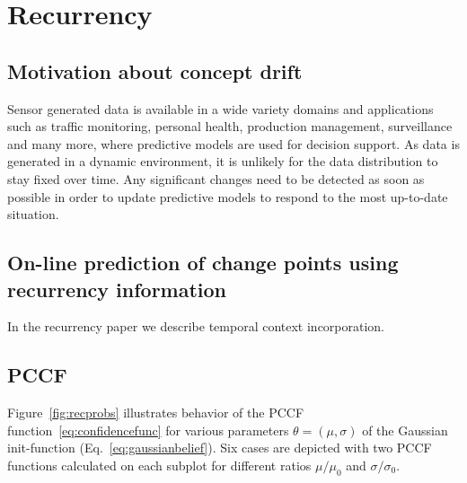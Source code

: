 \chapter{Recurrency}




\section{Motivation about concept drift}
Sensor generated data is available in a wide variety domains and applications such as traffic monitoring, personal health, production management, surveillance and many more, where predictive models are used for decision support.
As data is generated in a dynamic environment, it is unlikely for the data distribution to stay fixed over time.
Any significant changes need to be detected as soon as possible in order to update predictive models to respond to the most up-to-date situation.
\section{On-line prediction of change points using recurrency information}
In the recurrency paper we describe temporal context incorporation.


\section{PCCF}
Figure~\ref{fig:recprobs} illustrates behavior of the PCCF function~\ref{eq:confidencefunc} for  various parameters $\theta = (\mu, \sigma)$ of the Gaussian init-function (Eq.~\ref{eq:gaussianbelief}).%
Six cases are depicted with two PCCF functions calculated on each subplot for different ratios $\mu / \mu_0$ and $\sigma / \sigma_0$.

